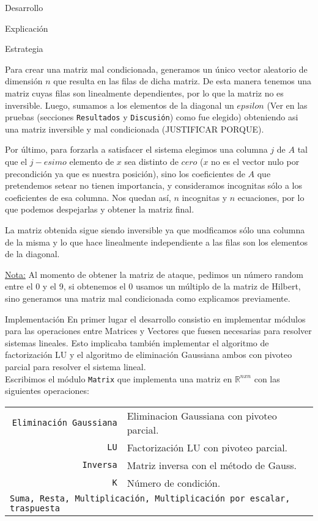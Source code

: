 \begin{section}{Desarrollo}
\begin{subsection}{Explicación}
\begin{subsubsection}{Estrategia}
\begin{enumerate}
			Para crear una matriz mal condicionada, generamos un único vector aleatorio de dimensión $n$ que resulta en las filas de dicha matriz. De esta manera tenemos una matriz cuyas filas son linealmente dependientes, por lo que la matriz no es inversible. Luego, sumamos a los elementos de la diagonal un $epsilon$ (Ver en las pruebas (secciones \texttt{Resultados} y \texttt{Discusión}) como fue elegido) obteniendo asi una matriz inversible y mal condicionada (JUSTIFICAR PORQUE).
			
			Por último, para forzarla a satisfacer el sistema elegimos una columna $j$ de $A$ tal que el $j-esimo$ elemento de $x$ sea distinto de $cero$ ($x$ no es el vector nulo por precondición ya que es nuestra posición), sino los coeficientes de $A$ que pretendemos setear no tienen importancia, y consideramos incognitas sólo a los coeficientes de esa columna. Nos quedan así, $n$ incognitas y $n$ ecuaciones, por lo que podemos despejarlas y obtener la matriz final.
			
			La matriz obtenida sigue siendo inversible ya que modficamos sólo una columna de la misma y lo que hace linealmente independiente a las filas son los elementos de la diagonal.
			
			\underline{Nota:} Al momento de obtener la matriz de ataque, pedimos un número random entre el 0 y el 9, si obtenemos el 0 usamos un múltiplo de la matriz de Hilbert, sino generamos una matriz mal condicionada como explicamos previamente.
			\end{enumerate}
		\end{subsubsection}
	\end{subsection}
	\begin{subsection}{Implementación}
		En primer lugar el desarrollo consistio en implementar módulos para las operaciones entre Matrices y Vectores que fuesen necesarias para resolver sistemas lineales. Esto implicaba también implementar el algoritmo de factorización LU y el algoritmo de eliminación Gaussiana ambos con pivoteo parcial para resolver el sistema lineal.\\
		
		Escribimos el módulo \texttt{Matrix} que implementa una matriz en $\mathbb{R}^{nxn}$ con las siguientes operaciones:\\
		
		\begin{tabular}{rl}
			\texttt{Eliminación Gaussiana} & Eliminacion Gaussiana con pivoteo parcial.\\
			\texttt{LU} & Factorización LU con pivoteo parcial.\\
			\texttt{Inversa} & Matriz inversa con el método de Gauss.\\
			\texttt{K} & Número de condición.\\
			\multicolumn{2}{l}{
				\texttt{Suma, Resta, Multiplicación, Multiplicación por escalar, traspuesta}
			}
		\end{tabular}\\
		

\end{subsection}
\end{section}

